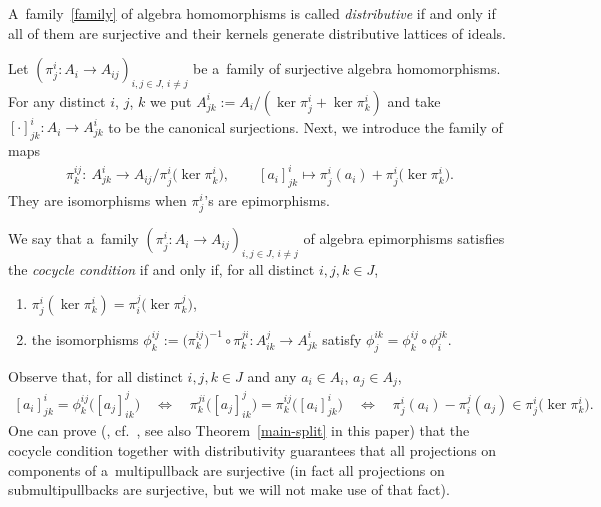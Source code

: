 \documentclass[11pt]{article}
\begin{document}
\begin{definition} A~family~\eqref{family} of algebra homomorphisms is called \emph{distributive} if and only if all of
them are surjective and their kernels generate distributive lattices of ideals.
\end{definition}

Let $(\pi^i_j:A_i\rightarrow A_{ij})_{i,j\in J,\,i\neq j}$ be a~family of surjective algebra homomorphisms.
For any distinct $i$, $j$, $k$ we put $A^i_{jk}:=A_i/(\ker\pi^i_j+\ker\pi^i_k)$ and take $[\cdot]^i_{jk}:A_i\rightarrow
A^i_{jk}$ to be the canonical surjections.
Next, we introduce the family of maps
\begin{gather*}
\pi^{ij}_k: \ A^i_{jk}\longrightarrow A_{ij}/\pi^i_j\big(\ker\pi^i_k\big),
\qquad
[a_i]^i_{jk}\longmapsto\pi^i_j(a_i)+\pi^i_j\big(\ker\pi^i_k\big).
\end{gather*}
They are isomorphisms when $\pi^i_j$'s are epimorphisms.

\begin{definition}
\label{cocycle-def}
We say \cite[Proposition~9]{CM2000} that a~family $(\pi^i_j:A_i\rightarrow A_{ij})_{i,j\in J,\,i\neq j}$ of algebra
epimorphisms satisf\/ies the {\em cocycle condition} if and only if, for all distinct $i,j,k\in J$,
\begin{enumerate}\itemsep=0pt
\item[1)] $\pi^i_j(\ker\pi^i_k)=\pi^j_i\big(\ker\pi^j_k\big)$,
\item[2)] the isomorphisms $\phi^{ij}_k:=\big(\pi^{ij}_k\big)^{-1}\circ\pi^{ji}_k:A^j_{ik}\rightarrow A^i_{jk}$ satisfy
$\phi^{ik}_j=\phi^{ij}_k\circ\phi^{jk}_i$.
\end{enumerate}
\end{definition}

Observe that, for all distinct $i,j,k\in J$ and any $a_i\in A_i$, $a_j\in A_j$,
\begin{gather}
\label{eqphi}
[a_i]^i_{jk}=\phi^{ij}_k\big([a_j]^j_{ik}\big)
\quad\!
\Leftrightarrow
\quad\!
\pi^{ji}_k\big([a_j]^j_{ik}\big)=\pi^{ij}_k\big([a_i]^{i}_{jk}\big)
\quad\!
\Leftrightarrow
\quad\!
\pi^i_j(a_i)-\pi^j_i(a_j)\in\pi^i_j\big(\ker\pi^i_k\big).\!\!\!
\end{gather}
One can prove (\cite{CM2000}, cf.~\cite{cocycle}, see also Theorem~\ref{main-split} in this paper) that the cocycle
condition together with distributivity guarantees that all projections on components of a~multipullback are surjective
(in fact all projections on submultipullbacks are surjective, but we will not make use of that fact).
\end{document}
